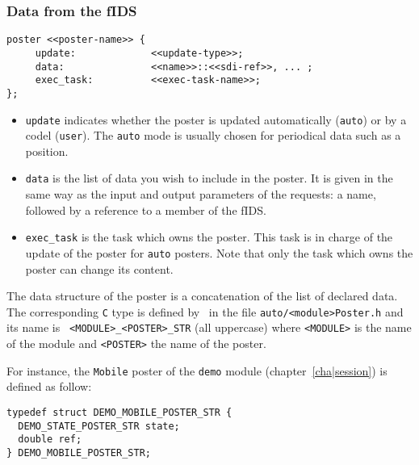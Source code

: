 \subsubsection{Data from the fIDS}

\begin{center}\begin{cartouche}\small\begin{verbatim}
poster <<poster-name>> {
     update:             <<update-type>>;
     data:               <<name>>::<<sdi-ref>>, ... ;
     exec_task:          <<exec-task-name>>;
};
\end{verbatim}\end{cartouche}\end{center}

\begin{itemize}
\item {\tt update} indicates whether the poster is updated automatically
({\tt auto}) or by  a codel ({\tt user}). The  {\tt auto} mode is usually
chosen for periodical data such as a position.

\item {\tt data} is the list of data you wish to include in the
poster. It is given in the same way as the input and output parameters of
the requests: a name, followed by a reference to a member of the fIDS.

\item {\tt exec\_task} is the task which owns the poster. This task is in
charge of the update of the poster for {\tt auto} posters. Note that only
the task which owns the poster can change its content.
\end{itemize}

The data  structure  of the  poster is  a concatenation  of  the  list of
declared data.  The corresponding  {\tt C} type  is defined by \GenoM\ in
the     file   {\tt  auto/<module>Poster.h} and     its    name  is  {\tt
<MODULE>\_<POSTER>\_STR} (all uppercase) where {\tt <MODULE>} is the name
of the module and {\tt <POSTER>} the name of the poster.

For  instance,   the {\tt  Mobile}  poster  of    the {\tt  demo}  module
(chapter~\ref{cha|session}) is defined as follow:

\begin{center}\begin{cartouche}\small\begin{verbatim}
typedef struct DEMO_MOBILE_POSTER_STR {
  DEMO_STATE_POSTER_STR state;
  double ref;
} DEMO_MOBILE_POSTER_STR;
\end{verbatim}\end{cartouche}\end{center}


